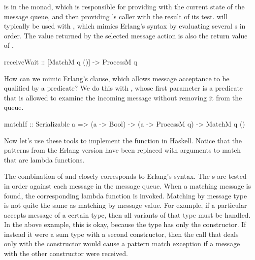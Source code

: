 \documentclass[preprint]{sigplanconf}
\begin{document}
 is in the  monad, which is responsible for providing  with the current state of the message queue, and then providing 's caller with the result of its test.  will typically be used with , which mimics Erlang's  syntax by evaluating several s in order. The value returned by the selected message action is also the return value of .

\begin{code}
receiveWait :: [MatchM q ()] -> ProcessM q
\end{code}

How can we mimic Erlang's  clause, which allows message acceptance to be qualified by a predicate? 
We do this with , whose first parameter is a predicate that is allowed to examine the incoming message without removing it from the queue.

\begin{code}
matchIf :: Serializable a => (a -> Bool) -> 
								(a -> ProcessM q) -> MatchM q ()
\end{code}

Now let's use these tools to implement the  function in Haskell. 
Notice that the patterns from the Erlang version have been replaced with arguments to match that are lambda functions.

\needspace{14ex}

The combination of  and  closely corresponds to Erlang's  syntax. The s are tested in order against each message in the message queue. When a matching message is found, the corresponding lambda function is invoked. 
Matching by message type is not quite the same as matching by message value. For example, if a particular  accepts message of a certain type, then all variants of that type must be handled. In the above example, this is okay, because the  type has only the  constructor. 
If instead it were a sum type with a second constructor, then the  call that deals only with the  constructor would cause a pattern match exception if a message with the other constructor were received.
\end{document}

